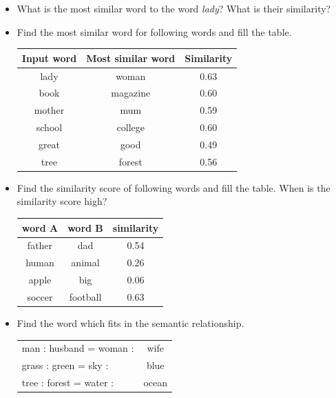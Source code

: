 \documentclass[12pt,fleqn]{article}
\begin{document}
\begin{enumerate}
\begin{itemize} 
 \item What is the most similar word to the word \textit{lady}? What is their similarity? 
 \item Find the most similar word for following words and fill the table. 
 \begin{table}[h] 
  \begin{center} 
     \begin{tabular}{c|c|c}
      Input word & Most similar word & Similarity \\  \hline 
      lady & woman & 0.63 \\ 
      book & magazine & 0.60 \\ 
      mother & mum & 0.59 \\ 
      school & college & 0.60 \\ 
      great & good & 0.49 \\ 
      tree & forest & 0.56 \\ 
     \end{tabular}
  \end{center}
\end{table}
\item Find the similarity score of following words and fill the table. When is the similarity score high? 
\begin{table}[h] 
   \begin{center} 
         \begin{tabular}{c|c|c}
          word A & word B & similarity \\  \hline 
          father & dad & 0.54 \\ 
          human & animal & 0.26 \\ 
          apple & big & 0.06 \\ 
          soccer & football & 0.63 \\ 
         \end{tabular}
   \end{center}
\end{table}

\item Find the word which fits in the semantic relationship.

\begin{table}[h] 
   \begin{center} 
         \begin{tabular}{lc}
man : husband = woman :& wife \\ 
grass : green = sky : & blue \\ 
tree : forest = water : & ocean\\ 
         \end{tabular}
   \end{center}
\end{table}
\end{itemize}


\end{enumerate}
\end{document}
